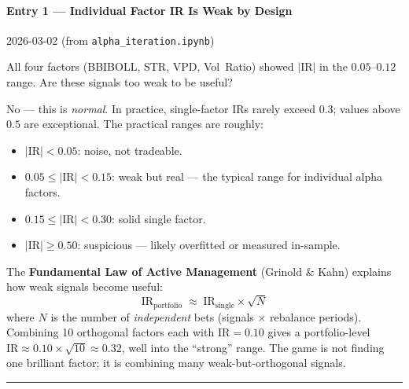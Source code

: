\documentclass[a4paper, 11pt]{report}
\theoremstyle{definition}
\theoremstyle{remark}
\begin{document}
\paragraph{Entry 1 --- Individual Factor IR Is Weak by Design}
\label{exp:weak-ir}
\begin{description}[style=nextline, leftmargin=1.8cm]
    \item[Date] 2026-03-02 \quad (from \texttt{alpha\_iteration.ipynb})
    \item[Question]
        All four factors (BBIBOLL, STR, VPD, Vol~Ratio) showed
        $|\mathrm{IR}|$ in the $0.05$--$0.12$ range.
        Are these signals too weak to be useful?
    \item[Finding]
        No --- this is \emph{normal}.
        In practice, single-factor IRs rarely exceed $0.3$;
        values above $0.5$ are exceptional.
        The practical ranges are roughly:
        \begin{itemize}[nosep]
            \item $|\mathrm{IR}| < 0.05$: noise, not tradeable.
            \item $0.05 \le |\mathrm{IR}| < 0.15$: weak but real ---
                  the typical range for individual alpha factors.
            \item $0.15 \le |\mathrm{IR}| < 0.30$: solid single factor.
            \item $|\mathrm{IR}| \ge 0.50$: suspicious --- likely overfitted
                  or measured in-sample.
        \end{itemize}

    \item[Why It Matters]
        The \textbf{Fundamental Law of Active Management}
        (Grinold \& Kahn) explains how weak signals become useful:
        \[
            \mathrm{IR}_{\text{portfolio}}
            \;\approx\; \mathrm{IR}_{\text{single}} \times \sqrt{N}
        \]
        where $N$ is the number of \emph{independent} bets (signals $\times$
        rebalance periods).
        Combining 10 orthogonal factors each with $\mathrm{IR} = 0.10$ gives
        a portfolio-level $\mathrm{IR} \approx 0.10 \times \sqrt{10} \approx 0.32$,
        well into the ``strong'' range.
        The game is not finding one brilliant factor; it is combining many
        weak-but-orthogonal signals.
\end{description}

\bigskip\noindent\rule{\textwidth}{0.4pt}
\end{document}
